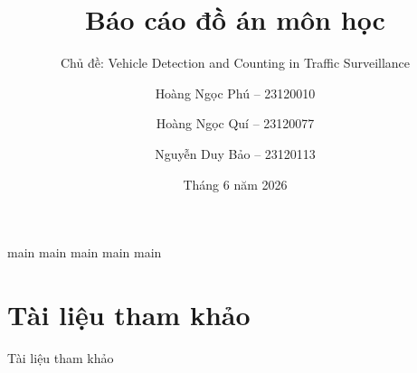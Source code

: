 \documentclass[beamer]{beamer}
\author{
  Hoàng Ngọc Phú -- 23120010 \and
  Hoàng Ngọc Quí -- 23120077 \and
  Nguyễn Duy Bảo -- 23120113
}
\title{Báo cáo đồ án môn học}
\subtitle{Chủ đề: Vehicle Detection and Counting in Traffic Surveillance}
\date{Tháng 6 năm 2026}
\begin{document}
\begin{frame}[plain]
  \titlepage
\end{frame}

{main}
{main}
{main}
{main}
{main}

\section*{Tài liệu tham khảo}

\begin{frame}[allowframebreaks]{Tài liệu tham khảo}
  \nocite{*}
  
  
\end{frame}
\end{document}
